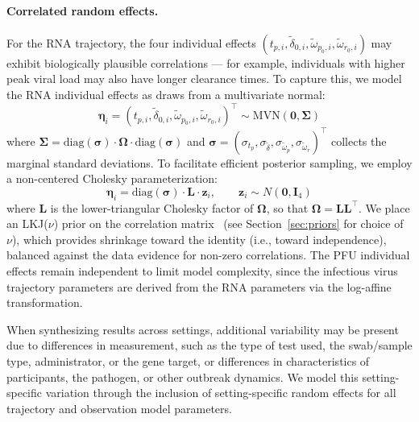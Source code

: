 \documentclass[12pt]{article}
\begin{document}
\paragraph{Correlated random effects.} For the RNA trajectory, the four individual effects $(t_{p,i}, \tilde\delta_{0,i}, \tilde\omega_{p_0,i}, \tilde\omega_{r_0,i})$ may exhibit biologically plausible correlations --- for example, individuals with higher peak viral load may also have longer clearance times. To capture this, we model the RNA individual effects as draws from a multivariate normal:
\begin{equation*}
    \boldsymbol{\eta}_i = (t_{p,i}, \tilde\delta_{0,i}, \tilde\omega_{p_0,i}, \tilde\omega_{r_0,i})^\top \sim \text{MVN}(\mathbf{0}, \boldsymbol{\Sigma})
\end{equation*}
where $\boldsymbol{\Sigma} = \text{diag}(\boldsymbol{\sigma}) \cdot \boldsymbol{\Omega} \cdot \text{diag}(\boldsymbol{\sigma})$ and $\boldsymbol{\sigma} = (\sigma_{t_p}, \sigma_{\tilde\delta}, \sigma_{\tilde\omega_p}, \sigma_{\tilde\omega_r})^\top$ collects the marginal standard deviations. To facilitate efficient posterior sampling, we employ a non-centered Cholesky parameterization:
\begin{equation*}
    \boldsymbol{\eta}_i = \text{diag}(\boldsymbol{\sigma}) \cdot \mathbf{L} \cdot \mathbf{z}_i, \qquad \mathbf{z}_i \sim N(\mathbf{0}, \mathbf{I}_4)
\end{equation*}
where $\mathbf{L}$ is the lower-triangular Cholesky factor of $\boldsymbol{\Omega}$, so that $\boldsymbol{\Omega} = \mathbf{L}\mathbf{L}^\top$. We place an LKJ($\nu$) prior on the correlation matrix~\cite{lewandowski2009generating} (see Section~\ref{sec:priors} for choice of $\nu$), which provides shrinkage toward the identity (i.e., toward independence), balanced against the data evidence for non-zero correlations. The PFU individual effects remain independent to limit model complexity, since the infectious virus trajectory parameters are derived from the RNA parameters via the log-affine transformation.

When synthesizing results across settings, additional variability may be present due to differences in measurement, such as the type of test used, the swab/sample type, administrator, or the gene target, or differences in characteristics of participants, the pathogen, or other outbreak dynamics. We model this setting-specific variation through the inclusion of setting-specific random effects for all trajectory and observation model parameters.
\end{document}
